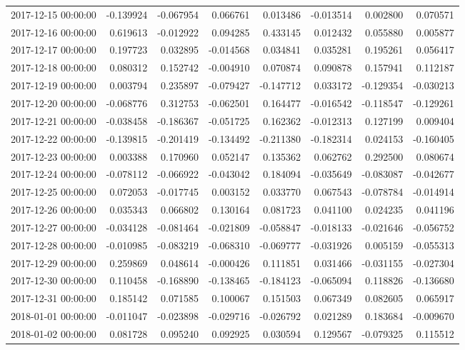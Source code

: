 \begin{tabular}{lrrrrrrr}
2017-12-15 00:00:00 & -0.139924 & -0.067954 & 0.066761 & 0.013486 & -0.013514 & 0.002800 & 0.070571 \\
2017-12-16 00:00:00 & 0.619613 & -0.012922 & 0.094285 & 0.433145 & 0.012432 & 0.055880 & 0.005877 \\
2017-12-17 00:00:00 & 0.197723 & 0.032895 & -0.014568 & 0.034841 & 0.035281 & 0.195261 & 0.056417 \\
2017-12-18 00:00:00 & 0.080312 & 0.152742 & -0.004910 & 0.070874 & 0.090878 & 0.157941 & 0.112187 \\
2017-12-19 00:00:00 & 0.003794 & 0.235897 & -0.079427 & -0.147712 & 0.033172 & -0.129354 & -0.030213 \\
2017-12-20 00:00:00 & -0.068776 & 0.312753 & -0.062501 & 0.164477 & -0.016542 & -0.118547 & -0.129261 \\
2017-12-21 00:00:00 & -0.038458 & -0.186367 & -0.051725 & 0.162362 & -0.012313 & 0.127199 & 0.009404 \\
2017-12-22 00:00:00 & -0.139815 & -0.201419 & -0.134492 & -0.211380 & -0.182314 & 0.024153 & -0.160405 \\
2017-12-23 00:00:00 & 0.003388 & 0.170960 & 0.052147 & 0.135362 & 0.062762 & 0.292500 & 0.080674 \\
2017-12-24 00:00:00 & -0.078112 & -0.066922 & -0.043042 & 0.184094 & -0.035649 & -0.083087 & -0.042677 \\
2017-12-25 00:00:00 & 0.072053 & -0.017745 & 0.003152 & 0.033770 & 0.067543 & -0.078784 & -0.014914 \\
2017-12-26 00:00:00 & 0.035343 & 0.066802 & 0.130164 & 0.081723 & 0.041100 & 0.024235 & 0.041196 \\
2017-12-27 00:00:00 & -0.034128 & -0.081464 & -0.021809 & -0.058847 & -0.018133 & -0.021646 & -0.056752 \\
2017-12-28 00:00:00 & -0.010985 & -0.083219 & -0.068310 & -0.069777 & -0.031926 & 0.005159 & -0.055313 \\
2017-12-29 00:00:00 & 0.259869 & 0.048614 & -0.000426 & 0.111851 & 0.031466 & -0.031155 & -0.027304 \\
2017-12-30 00:00:00 & 0.110458 & -0.168890 & -0.138465 & -0.184123 & -0.065094 & 0.118826 & -0.136680 \\
2017-12-31 00:00:00 & 0.185142 & 0.071585 & 0.100067 & 0.151503 & 0.067349 & 0.082605 & 0.065917 \\
2018-01-01 00:00:00 & -0.011047 & -0.023898 & -0.029716 & -0.026792 & 0.021289 & 0.183684 & -0.009670 \\
2018-01-02 00:00:00 & 0.081728 & 0.095240 & 0.092925 & 0.030594 & 0.129567 & -0.079325 & 0.115512 \\

\end{tabular}
